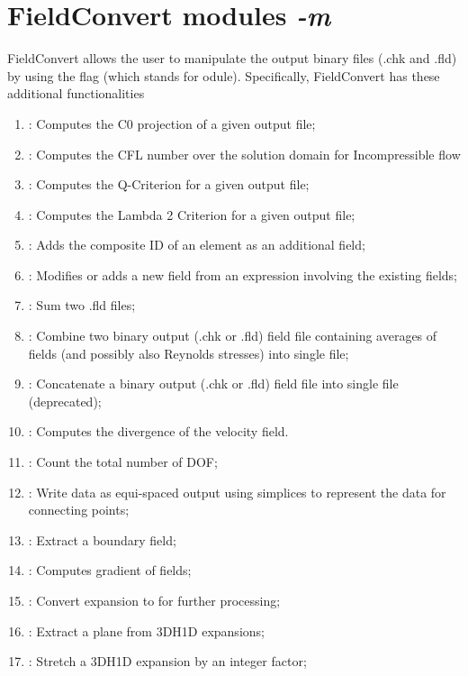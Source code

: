 \section{FieldConvert modules \textit{-m}}
FieldConvert allows the user to manipulate the \nekpp output
binary files (.chk and .fld) by using the flag  (which
stands for odule).
Specifically, FieldConvert has these additional functionalities
%
\begin{enumerate}
\item {}: Computes the C0 projection of a given output file;
\item {}: Computes the CFL number over the solution domain for Incompressible flow
\item {}: Computes the Q-Criterion for a given output file;
\item {}: Computes the Lambda 2 Criterion for a given output file;
\item {}: Adds the composite ID of an element as an additional field;
\item {}: Modifies or adds a new field from an expression involving the existing fields;
\item {}: Sum two .fld files;
\item {}: Combine two \nekpp binary output (.chk or .fld) field file containing averages of fields (and
possibly also Reynolds stresses) into single file;
\item {}: Concatenate a \nekpp binary output (.chk or .fld) field file into single file (deprecated);
\item {}: Computes the divergence of the velocity field.
\item {}: Count the total number of DOF;
\item {}: Write data as equi-spaced output using simplices to represent the data for connecting points;
\item {}: Extract a boundary field;
\item {}: Computes gradient of fields;
\item {}: Convert  expansion to  for further processing;
\item {}: Extract a plane from 3DH1D expansions;
\item {}: Stretch a 3DH1D expansion by an integer factor;

\end{enumerate}
